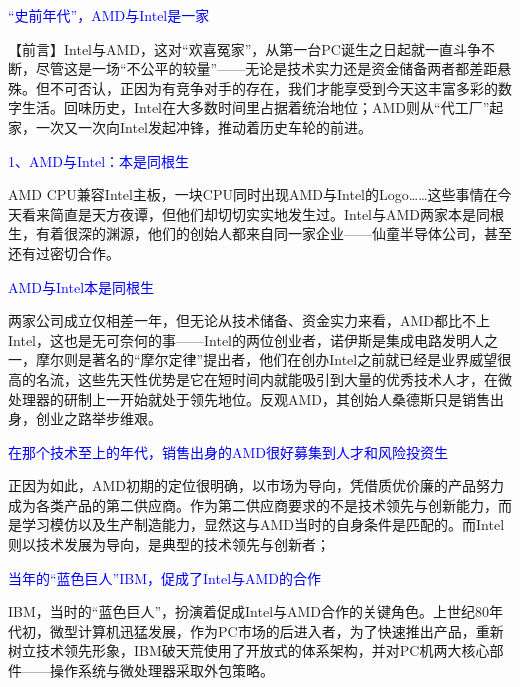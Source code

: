 \documentclass[utf8]{book}
\begin{document}
	\begin{flushleft}
		{\Large \textcolor{blue}{“史前年代”，AMD与Intel是一家}}
	\end{flushleft}

	【前言】Intel与AMD，这对“欢喜冤家”，从第一台PC诞生之日起就一直斗争不断，尽管这是一场“不公平的较量”——无论是技术实力还是资金储备两者都差距悬殊。但不可否认，正因为有竞争对手的存在，我们才能享受到今天这丰富多彩的数字生活。回味历史，Intel在大多数时间里占据着统治地位；AMD则从“代工厂”起家，一次又一次向Intel发起冲锋，推动着历史车轮的前进。

	\begin{flushleft}
	{\large \textcolor{blue}{	1、AMD与Intel：本是同根生}}
	\end{flushleft}

	AMD CPU兼容Intel主板，一块CPU同时出现AMD与Intel的Logo……这些事情在今天看来简直是天方夜谭，但他们却切切实实地发生过。Intel与AMD两家本是同根生，有着很深的渊源，他们的创始人都来自同一家企业——仙童半导体公司，甚至还有过密切合作。


	\begin{flushleft}
		{\large \textcolor{blue}{	AMD与Intel本是同根生}}
	\end{flushleft}

	两家公司成立仅相差一年，但无论从技术储备、资金实力来看，AMD都比不上Intel，这也是无可奈何的事——Intel的两位创业者，诺伊斯是集成电路发明人之一，摩尔则是著名的“摩尔定律”提出者，他们在创办Intel之前就已经是业界威望很高的名流，这些先天性优势是它在短时间内就能吸引到大量的优秀技术人才，在微处理器的研制上一开始就处于领先地位。反观AMD，其创始人桑德斯只是销售出身，创业之路举步维艰。

	\begin{flushleft}
	{\large \textcolor{blue}{在那个技术至上的年代，销售出身的AMD很好募集到人才和风险投资生}}
	\end{flushleft}

 	正因为如此，AMD初期的定位很明确，以市场为导向，凭借质优价廉的产品努力成为各类产品的第二供应商。作为第二供应商要求的不是技术领先与创新能力，而是学习模仿以及生产制造能力，显然这与AMD当时的自身条件是匹配的。而Intel则以技术发展为导向，是典型的技术领先与创新者；

	\begin{flushleft}
		{\large \textcolor{blue}{	当年的“蓝色巨人”IBM，促成了Intel与AMD的合作}}
	\end{flushleft}

	IBM，当时的“蓝色巨人”，扮演着促成Intel与AMD合作的关键角色。上世纪80年代初，微型计算机迅猛发展，作为PC市场的后进入者，为了快速推出产品，重新树立技术领先形象，IBM破天荒使用了开放式的体系架构，并对PC机两大核心部件——操作系统与微处理器采取外包策略。
\end{document}

